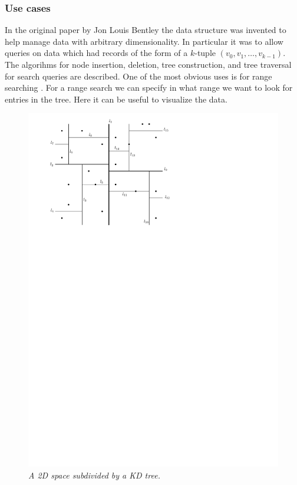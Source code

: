 \documentclass[12pt]{article}
\begin{document}
\subsubsection{Use cases}
In the original paper by Jon Louis Bentley\cite{bentley1975multidimensional} the data structure was invented to help manage data with arbitrary dimensionality. In particular it was to allow queries on data which had records of the form of a $k$-tuple $(v_0, v_1, \dots, v_{k-1})$. The algorihms for node insertion, deletion, tree construction, and tree traversal for search queries are described. One of the most obvious uses is for range searching \cite{bentley1975multidimensional}. For a range search we can specify in what range we want to look for entries in the tree. Here it can be useful to visualize the data.
\begin{figure}
\centering
\includegraphics{figs/kdTreePlane}
\caption{\textit{A 2D space subdivided by a KD tree.}}
\label{figure:kdp}
\end{figure}
\end{document}

